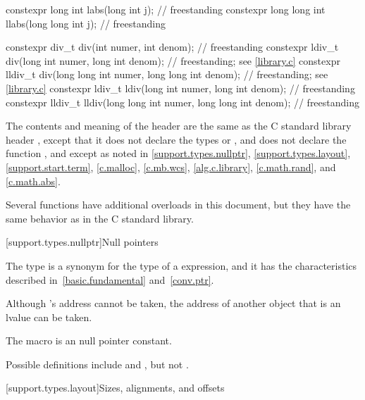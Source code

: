 \begin{codeblock}
{  constexpr long int labs(long int j);                                  // freestanding
  constexpr long long int llabs(long long int j);                       // freestanding

  constexpr div_t div(int numer, int denom);                            // freestanding
  constexpr ldiv_t div(long int numer, long int denom);                 // freestanding; see \ref{library.c}
  constexpr lldiv_t div(long long int numer, long long int denom);      // freestanding; see \ref{library.c}
  constexpr ldiv_t ldiv(long int numer, long int denom);                // freestanding
  constexpr lldiv_t lldiv(long long int numer, long long int denom);    // freestanding
}
\end{codeblock}

\pnum
The contents and meaning of the header  are the same as
the C standard library header ,
except that it does not declare the types  or ,
and does not declare the function ,
and except as noted in
\ref{support.types.nullptr},
\ref{support.types.layout},
\ref{support.start.term},
\ref{c.malloc},
\ref{c.mb.wcs},
\ref{alg.c.library},
\ref{c.math.rand}, and
\ref{c.math.abs}.
\begin{note}
Several functions have additional overloads in this document,
but they have the same behavior as in the C standard library.
\end{note}


[support.types.nullptr]{Null pointers}

\pnum
{}%
The type  is a synonym
for the type of a  expression, and it
has the characteristics
described in~\ref{basic.fundamental} and~\ref{conv.ptr}.
\begin{note}
Although 's address cannot be taken, the address of another
 object that is an lvalue can be taken.
\end{note}

\pnum
The macro
%
is an  null pointer constant.
\begin{footnote}
Possible definitions include
and
,
but not
.
\end{footnote}


[support.types.layout]{Sizes, alignments, and offsets}


